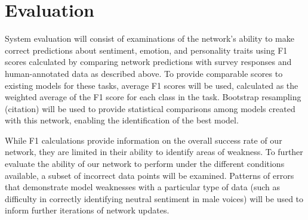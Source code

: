 \section{Evaluation}

System evaluation will consist of examinations of the network's ability to make
correct predictions about sentiment, emotion, and personality traits using F1
scores calculated by comparing network predictions with survey responses and
human-annotated data as described above. To provide comparable scores to
existing models for these tasks, average F1 scores will be used, calculated as
the weighted average of the F1 score for each class in the task.  Bootstrap
resampling (citation) will be used to provide statistical
comparisons among models created with this network, enabling the identification of the best model. 

While F1 calculations provide information on the overall success rate of our
network, they are limited in their ability to identify areas of weakness. To
further evaluate the ability of our network  to perform under the different
conditions available, a subset of incorrect data points will be examined.
Patterns of errors that demonstrate model weaknesses with a particular type of
data (such as difficulty in correctly identifying neutral sentiment in male
voices) will be used to inform further iterations of network updates. 
